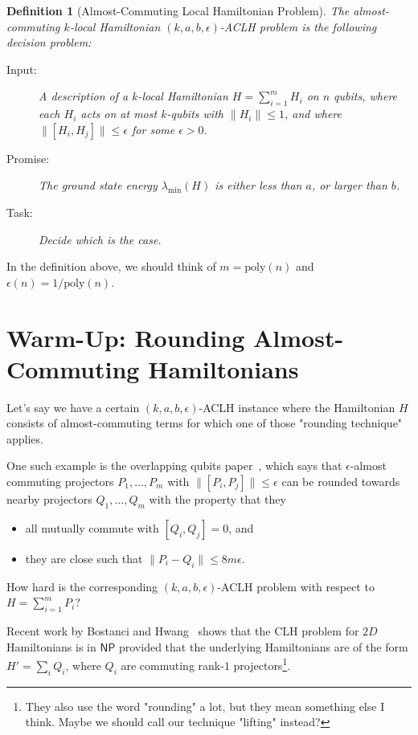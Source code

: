 \documentclass[12pt]{article}
\theoremstyle{plain}
\newtheorem{definition}[theorem]{Definition}
\begin{document}
\begin{definition}[Almost-Commuting Local Hamiltonian Problem] 
The almost-commuting $k$-local Hamiltonian $(k,a,b,\epsilon)$-ACLH problem is the following decision problem:
\begin{description}
    \item[Input:] A description of a $k$-local Hamiltonian $H = \sum_{i=1}^m H_i$ on $n$ qubits, where each $H_i$ acts on at most $k$-qubits with $\|H_i \| \leq 1$, and where $\|[H_i,H_j]\| \leq \epsilon$ for some $\epsilon > 0$.

    \item[Promise:] The ground state energy $\lambda_{\mathrm{min}}(H)$ is either less than $a$, or larger than $b$.

    \item[Task:] Decide which is the case.
\end{description}    
\end{definition}
In the definition above, we should think of $m=\mathrm{poly}(n)$ and $\epsilon(n)= 1/\mathrm{poly}(n)$.

\section{Warm-Up: Rounding Almost-Commuting Hamiltonians}

Let's say we have a certain $(k,a,b,\epsilon)$-ACLH instance where the Hamiltonian $H$ consists of almost-commuting terms for which one of those "rounding technique" applies.

One such example is the overlapping qubits paper~\cite[Theorem 3.2]{https://doi.org/10.4230/lipics.itcs.2017.48}, which says that $\epsilon$-almost commuting projectors $P_1,\dots,P_m$ with $\|[P_i,P_j]\| \leq \epsilon$ can be rounded towards nearby projectors $Q_1,\dots,Q_m$ with the property that they
\begin{itemize}
    \item all mutually commute with $[Q_i,Q_j]=0$, and
    \item they are close such that $\|P_i - Q_i\| \leq 8 m \epsilon$.
\end{itemize}
How hard is the corresponding $(k,a,b,\epsilon)$-ACLH problem with respect to $H= \sum_{i=1}^m P_i$?

Recent work by Bostanci and Hwang~\cite{bostanci2025commutinglocalhamiltonians2d} shows that the CLH problem for $2D$ Hamiltonians is in $\mathsf{NP}$ provided that the underlying Hamiltonians are of the form $H'=\sum_i Q_i$, where $Q_i$ are commuting rank-$1$ projectors\footnote{They also use the word "rounding" a lot, but they mean something else I think. Maybe we should call our technique "lifting" instead?}. 
\end{document}

